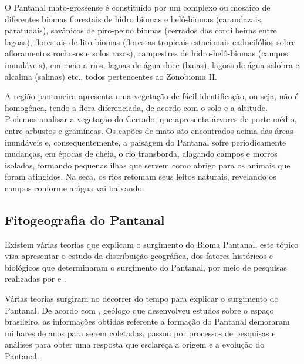 \begin{citacao}
	O Pantanal mato-grossense é constituído por um complexo ou mosaico de diferentes biomas florestais de hidro biomas e helô-biomas (carandazais, paratudais), savânicos de piro-peino biomas (cerrados das cordilheiras entre lagoas), florestais de lito biomas (florestas tropicais estacionais caducifólios sobre afloramentos rochosos e solos rasos), campestres de hidro-helô-biomas (campos inundáveis), em meio a rios, lagoas de água doce (baias), lagoas de água salobra e alcalina (salinas) etc., todos pertencentes ao Zonobioma II. \cite{coutinho2006conceito}
\end{citacao}


A região pantaneira apresenta uma vegetação de fácil identificação, ou seja, não é homogênea, tendo a flora diferenciada, de acordo com o solo e a altitude. Podemos analisar  a vegetação do Cerrado, que apresenta árvores de porte médio, entre arbustos e gramíneas. Os capões de mato são encontrados acima das áreas inundáveis e, consequentemente, a paisagem do Pantanal sofre periodicamente mudanças, em épocas de cheia, o rio transborda, alagando campos e morros isolados, formando pequenas ilhas que servem como abrigo para os animais que foram atingidos. Na seca, os rios retomam seus leitos naturais,  revelando os campos conforme a água vai baixando. \cite{eco}

\subsection{Fitogeografia do Pantanal} 

Existem várias teorias que explicam o surgimento do Bioma Pantanal,  este tópico visa apresentar o estudo da distribuição geográfica, dos fatores históricos e biológicos que determinaram o surgimento do Pantanal, por meio de pesquisas realizadas por  e .

Várias teorias surgiram no decorrer do tempo para explicar o surgimento do Pantanal. De acordo com , geólogo que desenvolveu estudos sobre o espaço brasileiro, as informações obtidas referente a formação do Pantanal demoraram milhares de anos para serem coletadas, passou por processos de pesquisas e análises para obter  uma resposta que esclareça a origem e a evolução do Pantanal.

